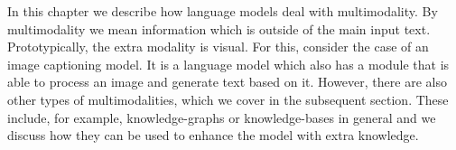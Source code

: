 In this chapter we describe how language models deal with multimodality.
By multimodality we mean information which is outside of the main input text.
Prototypically, the extra modality is visual.
For this, consider the case of an image captioning model.
It is a language model which also has a module that is able to process an image and generate text based on it.
However, there are also other types of multimodalities, which we cover in the subsequent section.
These include, for example, knowledge-graphs or knowledge-bases in general and we discuss how they can be used to enhance the model with extra knowledge.